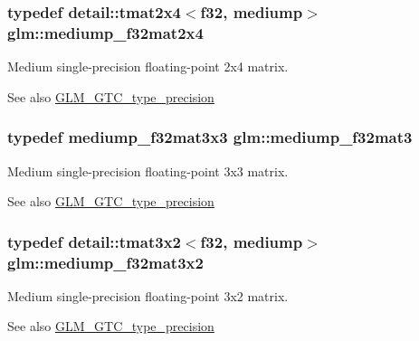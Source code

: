 \subsubsection[{\texorpdfstring{mediump\+\_\+f32mat2x4}{mediump_f32mat2x4}}]{\setlength{\rightskip}{0pt plus 5cm}typedef detail\+::tmat2x4$<$f32, mediump$>$ {\bf glm\+::mediump\+\_\+f32mat2x4}}\hypertarget{group__gtc__type__precision_ga20c5b3b715b70f1c09f7f95bfaa7aa84}{}\label{group__gtc__type__precision_ga20c5b3b715b70f1c09f7f95bfaa7aa84}
Medium single-\/precision floating-\/point 2x4 matrix. \begin{DoxySeeAlso}{See also}
\hyperlink{group__gtc__type__precision}{G\+L\+M\+\_\+\+G\+T\+C\+\_\+type\+\_\+precision} 
\end{DoxySeeAlso}
\subsubsection[{\texorpdfstring{mediump\+\_\+f32mat3}{mediump_f32mat3}}]{\setlength{\rightskip}{0pt plus 5cm}typedef mediump\+\_\+f32mat3x3 {\bf glm\+::mediump\+\_\+f32mat3}}\hypertarget{group__gtc__type__precision_gae263a08ef179894fdd36f9a51698c4ab}{}\label{group__gtc__type__precision_gae263a08ef179894fdd36f9a51698c4ab}
Medium single-\/precision floating-\/point 3x3 matrix. \begin{DoxySeeAlso}{See also}
\hyperlink{group__gtc__type__precision}{G\+L\+M\+\_\+\+G\+T\+C\+\_\+type\+\_\+precision} 
\end{DoxySeeAlso}
\subsubsection[{\texorpdfstring{mediump\+\_\+f32mat3x2}{mediump_f32mat3x2}}]{\setlength{\rightskip}{0pt plus 5cm}typedef detail\+::tmat3x2$<$f32, mediump$>$ {\bf glm\+::mediump\+\_\+f32mat3x2}}\hypertarget{group__gtc__type__precision_ga9762d48bb9b41e3cf40f6e616cf61b6b}{}\label{group__gtc__type__precision_ga9762d48bb9b41e3cf40f6e616cf61b6b}
Medium single-\/precision floating-\/point 3x2 matrix. \begin{DoxySeeAlso}{See also}
\hyperlink{group__gtc__type__precision}{G\+L\+M\+\_\+\+G\+T\+C\+\_\+type\+\_\+precision} 
\end{DoxySeeAlso}

